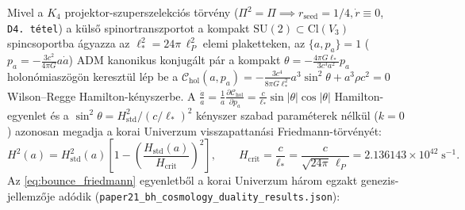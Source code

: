 \documentclass[11pt,a4paper]{article}
\theoremstyle{remark}
\begin{document}
Mivel a $K_4$ projektor-szuperszelekci\'os t\"orv\'eny ($\Pi^2 = \Pi \implies r_{\mathrm{seed}} = 1/4, \dot{r} \equiv 0$, \texttt{D4.\ t\'etel}) a k\"uls\H{o} spinortranszportot a kompakt $\mathrm{SU}(2) \subset \mathrm{Cl}(V_3)$ spincsoportba \'agyazza az $\ell_*^2 = 24\pi\,\ell_P^2$ elemi plaketteken, az $\{a, p_a\} = 1$ ($p_a = -\frac{3c^2}{4\pi G}a\dot{a}$) ADM kanonikus konjug\'alt p\'ar a kompakt $\theta = -\frac{4\pi G\ell_*}{3c^3 a^2}p_a$ holon\'omiasz\"og\"on kereszt\"ul l\'ep be a $\mathcal{C}_{\mathrm{hol}}(a, p_a) = -\frac{3c^4}{8\pi G\ell_*^2}a^3\sin^2\theta + a^3\rho c^2 = 0$ Wilson--Regge Hamilton-k\'enyszerbe. A $\frac{\dot{a}}{a} = \frac{1}{a}\frac{\partial\mathcal{C}_{\mathrm{hol}}}{\partial p_a} = \frac{c}{\ell_*}\sin|\theta|\cos|\theta|$ Hamilton-egyenlet \'es a $\sin^2\theta = H_{\mathrm{std}}^2 / (c/\ell_*)^2$ k\'enyszer szabad param\'eterek n\'elk\"ul ($k = 0$) azonosan megadja a korai Univerzum visszapattan\'asi Friedmann-t\"orv\'eny\'et:
\begin{equation}
  H^2(a) = H_{\mathrm{std}}^2(a)\!\left[1 - \left(\frac{H_{\mathrm{std}}(a)}{H_{\mathrm{crit}}}\right)^2\right], \qquad H_{\mathrm{crit}} = \frac{c}{\ell_*} = \frac{c}{\sqrt{24\pi}\,\ell_P} = 2.136143 \times 10^{42}\;\mathrm{s}^{-1}.
  \label{eq:bounce_friedmann}
\end{equation}
Az \eqref{eq:bounce_friedmann} egyenletb\H{o}l a korai Univerzum h\'arom egzakt genezis-jellemz\H{o}je ad\'odik (\texttt{paper21\_\allowbreak bh\_\allowbreak cosmology\_\allowbreak duality\_\allowbreak results.json}):
\end{document}
